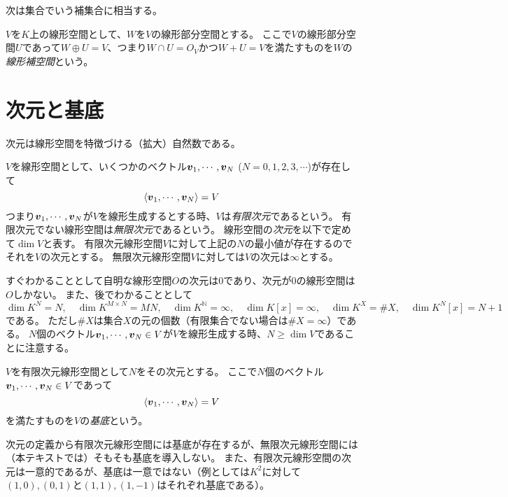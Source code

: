 次は集合でいう補集合に相当する。

\begin{definition}[線形補空間]
$V$を$K$上の線形空間として、$W$を$V$の線形部分空間とする。
ここで$V$の線形部分空間$U$であって$W\oplus U = V$、つまり$W\cap U = O_V$かつ$W+U = V$を満たすものを$W$の\emph{線形補空間}という。
\end{definition}

\section{次元と基底}

次元は線形空間を特徴づける（拡大）自然数である。

\begin{definition}[次元]
$V$を線形空間として、いくつかのベクトル$\vb*{v}_1, \cdots, \vb*{v}_N$ ($N = 0, 1, 2, 3, \cdots$)が存在して
$$
\langle \vb*{v}_1, \cdots, \vb*{v}_N \rangle = V
$$
つまり$\vb*{v}_1, \cdots, \vb*{v}_N$が$V$を線形生成するとする時、$V$は\emph{有限次元}であるという。
有限次元でない線形空間は\emph{無限次元}であるという。
線形空間の\emph{次元}を以下で定めて$\dim V$と表す。
有限次元線形空間$V$に対して上記の$N$の最小値が存在するのでそれを$V$の次元とする。
無限次元線形空間$V$に対しては$V$の次元は$\infty$とする。
\end{definition}

すぐわかることとして自明な線形空間$O$の次元は$0$であり、次元が$0$の線形空間は$O$しかない。
また、後でわかることとして
$$
\dim K^N = N,
\quad \dim K^{M\times N} = M N,
\quad \dim K^{\mathbb{N}} = \infty,
\quad \dim K[x] = \infty,
\quad \dim K^X = \# X,
\quad \dim K^N[x] = N+1
$$
である。
ただし$\# X$は集合$X$の元の個数（有限集合でない場合は$\# X = \infty$）である。
$N$個のベクトル$\vb*{v}_1, \cdots, \vb*{v}_N \in V$が$V$を線形生成する時、$N \ge \dim V$であることに注意する。

\begin{definition}[基底]
$V$を有限次元線形空間として$N$をその次元とする。
ここで$N$個のベクトル$\vb*{v}_1, \cdots, \vb*{v}_N \in V$であって
$$
\langle \vb*{v}_1, \cdots, \vb*{v}_N \rangle = V
$$
を満たすものを$V$の\emph{基底}という。
\end{definition}

次元の定義から有限次元線形空間には基底が存在するが、無限次元線形空間には（本テキストでは）そもそも基底を導入しない。
また、有限次元線形空間の次元は一意的であるが、基底は一意ではない（例としては$K^2$に対して$(1, 0), (0, 1)$と$(1, 1), (1, -1)$はそれぞれ基底である）。

